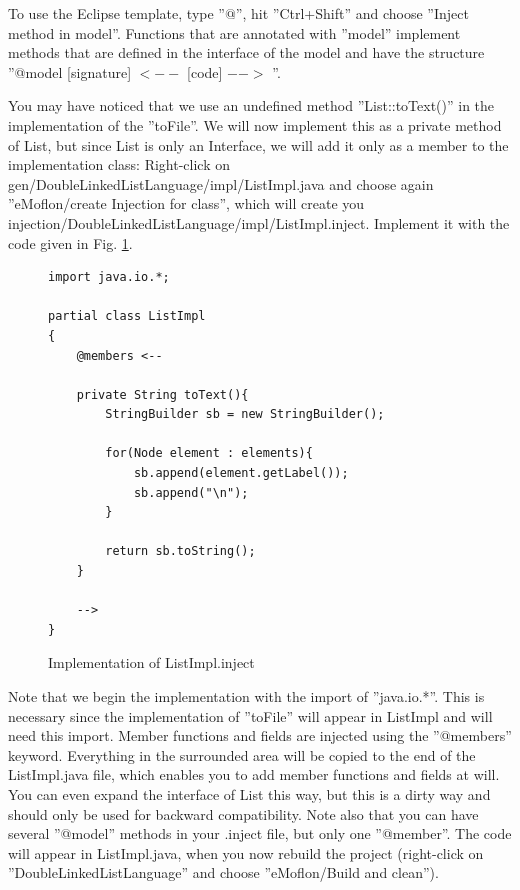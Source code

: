 To use the Eclipse template, type ''$@$'', hit ''Ctrl+Shift'' and choose ''Inject method in model''. Functions that are annotated with ''\@ model'' implement methods that are defined in the interface of the model and have the structure ''@model [signature] $<--$ [code] $-->$ ''.

You may have noticed that we use an undefined method ''List::toText()'' in the implementation of the ''toFile''. We will now implement this as a private method of List, but since List is only an Interface, we will add it only as a member to the implementation class: Right-click on gen/DoubleLinkedListLanguage/impl/ListImpl.java and choose again ''eMoflon/create Injection for class'', which will create you injection/DoubleLinkedListLanguage/impl/ListImpl.inject. Implement it with the code given in Fig. \ref{code:listImpl_toText_impl}.


\begin{figure}[htbp]
        \centering
        \begin{lstlisting}[language=Injection]
import java.io.*;

partial class ListImpl
{
    @members <--

    private String toText(){
        StringBuilder sb = new StringBuilder();

        for(Node element : elements){
            sb.append(element.getLabel());
            sb.append("\n");
        }

        return sb.toString();
    }

    -->
}
        \end{lstlisting}
        \caption{Implementation of ListImpl.inject}
        \label{code:listImpl_toText_impl}
    \end{figure}

Note that we begin the implementation with the import of ''java.io.*''. This is necessary since the implementation of ''toFile'' will appear in ListImpl and will need this import. Member functions and fields are injected using the ''@members'' keyword. Everything in the surrounded area will be copied to the end of the ListImpl.java file, which enables you to add member functions and fields at will. You can even expand the interface of List this way, but this is a dirty way and should only be used for backward compatibility. Note also that you can have several ''@model'' methods in your .inject file, but only one ''@member''.
The code will appear in ListImpl.java, when you now rebuild the project (right-click on ''DoubleLinkedListLanguage'' and choose ''eMoflon/Build and clean'').